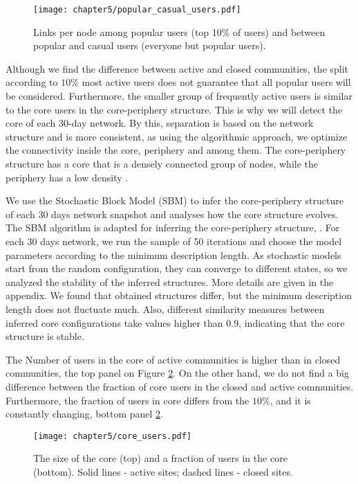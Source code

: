 \begin{figure}[h!]
	\centering
	\texttt{[image: chapter5/popular\_casual\_users.pdf]}
	\caption[Number of links per node]{Links per node among popular users (top 10\% of users) and between popular and casual users (everyone but popular users).}
	\label{fig:pop_cas_users}
\end{figure} 

Although we find the difference between active and closed communities, the split according to $10\%$  most active users does not guarantee that all popular users will be considered. Furthermore, the smaller group of frequently active users is similar to the core users in the core-periphery structure. This is why we will detect the core of each 30-day network. By this, separation is based on the network structure and is more consistent, as using the algorithmic approach, we optimize the connectivity inside the core, periphery and among them. The core-periphery structure has a core that is a densely connected group of nodes, while the periphery has a low density \cite{fortunato2010community, gallagher2020clarified}. 

We use the Stochastic Block Model (SBM) to infer the core-periphery structure of each 30 days network snapshot and analyses how the core structure evolves. The  SBM algorithm is adapted for inferring the core-periphery structure, \cite{gallagher2020clarified}. For each 30 days network, we run the sample of 50 iterations and choose the model parameters according to the minimum description length. As stochastic models start from the random configuration, they can converge to different states, so we analyzed the stability of the inferred structures. More details are given in the appendix. We found that obtained structures differ, but the minimum description length does not fluctuate much. Also, different similarity measures between inferred core configurations take values higher than 0.9, indicating that the core structure is stable. 

The Number of users in the core of active communities is higher than in closed communities, the top panel on Figure \ref{fig:core_size}. On the other hand, we do not find a big difference between the fraction of core users in the closed and active communities. Furthermore, the fraction of users in core differs from the $10\%$, and it is constantly changing, bottom panel \ref{fig:core_size}. 

\begin{figure}[h!]
	\centering
	\texttt{[image: chapter5/core\_users.pdf]}
	\caption[The size of the core]{The size of the core (top) and a fraction of users in the core (bottom). Solid lines - active sites; dashed lines - closed sites.}
	\label{fig:core_size}
\end{figure}

